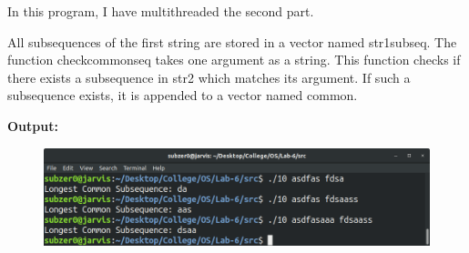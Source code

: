 \documentclass{article}
\begin{document}
In this program, I have multithreaded the second part. 

All subsequences of the first string are stored in a vector named 
str1\textunderscore subseq. The function check\textunderscore common\textunderscore seq takes one argument as 
a string. This function checks if there exists a subsequence in str2
which matches its argument. If such a subsequence exists, it is 
appended to a vector named common.

\pagebreak
\bigskip
\noindent
\textbf{\Large Output:}

\begin{figure}[h]
	\includegraphics[width=\textwidth]{output/10.png}
\end{figure}
\bigskip
\end{document}
